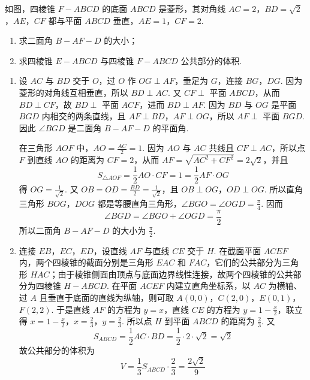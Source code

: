 \begin{problem}
如图，四棱锥 \(F - ABCD\) 的底面 \(ABCD\) 是菱形，其对角线 \(AC = 2\)，\(BD = \sqrt{2}\)，\(AE\)，\(CF\) 都与平面 \(ABCD\) 垂直，\(AE = 1\)，\(CF = 2\).

\begin{enumerate}
\item 求二面角 \(B - AF - D\) 的大小；
\item 求四棱锥 \(E - ABCD\) 与四棱锥 \(F - ABCD\) 公共部分的体积.
\end{enumerate}

\end{problem}

\begin{solution}
\begin{enumerate}
\item 设 \(AC\) 与 \(BD\) 交于 \(O\)，过 \(O\) 作 \(OG\perp AF\)，垂足为 \(G\)，连接 \(BG\)，\(DG\). 因为菱形的对角线互相垂直，所以 \(BD\perp AC\). 又 \(CF\perp\) 平面 \(ABCD\)，从而 \(BD\perp CF\)，故 \(BD\perp\) 平面 \(ACF\)，进而 \(BD\perp AF\). 因为 \(BD\) 与 \(OG\) 是平面 \(BGD\) 内相交的两条直线，且 \(AF\perp BD\)，\(AF\perp OG\)，所以 \(AF\perp\) 平面 \(BGD\). 因此 \(\angle BGD\) 是二面角 \(B-AF-D\) 的平面角.

在三角形 \(AOF\) 中，\(AO=\frac{AC}{2}=1\). 因为 \(AO\) 与 \(AC\) 共线且 \(CF\perp AC\)，所以点 \(F\) 到直线 \(AO\) 的距离为 \(CF=2\)，从而 \(AF=\sqrt{AC^{2}+CF^{2}}=2\sqrt{2}\)，并且
\[
S_{\triangle AOF}=\frac{1}{2}AO\cdot CF=1=\frac{1}{2}AF\cdot OG
\]
得 \(OG=\frac{1}{\sqrt{2}}\). 又 \(OB=OD=\frac{BD}{2}=\frac{1}{\sqrt{2}}\)，且 \(OB\perp OG\)，\(OD\perp OG\). 所以直角三角形 \(BOG\)，\(DOG\) 都是等腰直角三角形，\(\angle BGO=\angle OGD=\frac{\pi}{4}\). 因而
\[
\angle BGD=\angle BGO+\angle OGD=\frac{\pi}{2}
\]
所以二面角 \(B-AF-D\) 的大小为 \(\frac{\pi}{2}\).
\item 连接 \(EB\)，\(EC\)，\(ED\)，设直线 \(AF\) 与直线 \(CE\) 交于 \(H\). 在截面平面 \(ACEF\) 内，两个四棱锥的截面分别是三角形 \(EAC\) 和 \(FAC\)，它们的公共部分为三角形 \(HAC\)；由于棱锥侧面由顶点与底面边界线性连接，故两个四棱锥的公共部分为四棱锥 \(H-ABCD\). 在平面 \(ACEF\) 内建立直角坐标系，以 \(AC\) 为横轴、过 \(A\) 且垂直于底面的直线为纵轴，则可取 \(A(0,0)\)，\(C(2,0)\)，\(E(0,1)\)，\(F(2,2)\). 于是直线 \(AF\) 的方程为 \(y=x\)，直线 \(CE\) 的方程为 \(y=1-\frac{x}{2}\)，联立得
\(x=1-\frac{x}{2}\)，\(x=\frac{2}{3}\)，\(y=\frac{2}{3}\).
所以点 \(H\) 到平面 \(ABCD\) 的距离为 \(\frac{2}{3}\). 又
\[
S_{ABCD}=\frac{1}{2}AC\cdot BD=\frac{1}{2}\cdot2\cdot\sqrt{2}=\sqrt{2}
\]
故公共部分的体积为
\[
V=\frac{1}{3}S_{ABCD}\cdot\frac{2}{3}=\frac{2\sqrt{2}}{9}
\]
\end{enumerate}
\end{solution}

